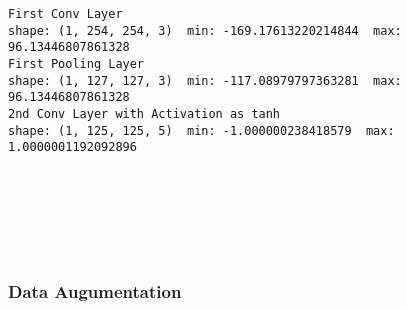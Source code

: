 \documentclass[11pt]{article}
\begin{document}
    \begin{Verbatim}[commandchars=\\\{\}]
First Conv Layer
shape: (1, 254, 254, 3)  min: -169.17613220214844  max: 96.13446807861328
First Pooling Layer
shape: (1, 127, 127, 3)  min: -117.08979797363281  max: 96.13446807861328
2nd Conv Layer with Activation as tanh
shape: (1, 125, 125, 5)  min: -1.000000238418579  max: 1.0000001192092896

    \end{Verbatim}

    \begin{center}
    \end{center}
    { \hspace*{\fill} \\}
    
    \begin{center}
    \end{center}
    { \hspace*{\fill} \\}
    
    \begin{center}
    \end{center}
    { \hspace*{\fill} \\}
    
    \subsubsection{Data Augumentation}\label{data-augumentation}
\end{document}
